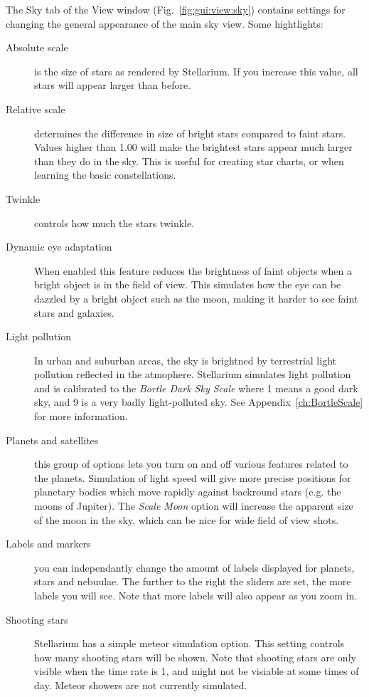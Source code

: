 The Sky tab of the View window (Fig.~\ref{fig:gui:view:sky}) contains settings
for changing the general appearance of the main sky view. Some
hightlights:

\begin{description}
\item[Absolute scale] is the size of stars as rendered by
  Stellarium. If you increase this value, all stars will appear larger
  than before.
\item[Relative scale] determines the difference in size of bright
  stars compared to faint stars. Values higher than 1.00 will make the
  brightest stars appear much larger than they do in the sky. This is
  useful for creating star charts, or when learning the basic
  constellations.
\item[Twinkle] controls how much the stars twinkle.
\item[Dynamic eye adaptation] When enabled this feature reduces the
  brightness of faint objects when a bright object is in the field of
  view. This simulates how the eye can be dazzled by a bright object
  such as the moon, making it harder to see faint stars and galaxies.
\item[Light pollution] In urban and suburban areas, the sky is
  brightned by terrestrial light pollution reflected in the atmophere.
  Stellarium simulates light pollution and is calibrated to the
  \emph{Bortle Dark Sky Scale} where 1 means a good dark sky, and 9 is
  a very badly light-polluted sky. See Appendix~\ref{ch:BortleScale}
  for more information.
\item[Planets and satellites] this group of options lets you turn on
  and off various features related to the planets. Simulation of light
  speed will give more precise positions for planetary bodies which move
  rapidly against backround stars (e.g. the moons of Jupiter). The
  \emph{Scale Moon} option will increase the apparent size of the moon
  in the sky, which can be nice for wide field of view shots.
\item[Labels and markers] you can independantly change the amount of
  labels displayed for planets, stars and nebuulae. The further to the
  right the sliders are set, the more labels you will see. Note that
  more labels will also appear as you zoom in.
\item[Shooting stars] Stellarium has a simple meteor simulation
  option. This setting controls how many shooting stars will be shown.
  Note that shooting stars are only visible when the time rate is 1, and
  might not be visiable at some times of day. Meteor showers are not
  currently simulated.
\end{description}


